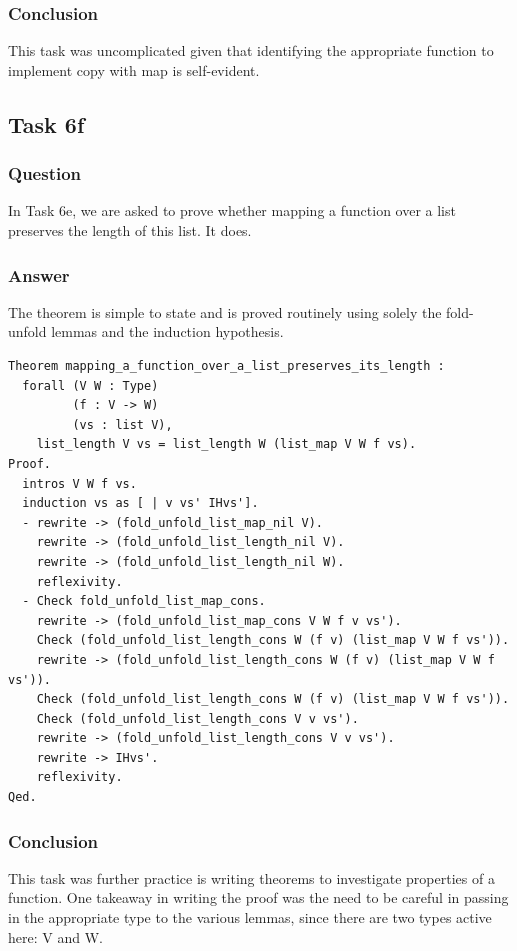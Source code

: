 \documentclass{article}
\begin{document}
\subsubsection{Conclusion}
This task was uncomplicated given that identifying the appropriate function to implement copy with map is self-evident.

\subsection{Task 6f}

\subsubsection{Question}
In Task 6e, we are asked to prove whether mapping a function over a list preserves the length of this list. It does.

\subsubsection{Answer}
The theorem is simple to state and is proved routinely using solely the fold-unfold lemmas and the induction hypothesis.

\begin{lstlisting}
Theorem mapping_a_function_over_a_list_preserves_its_length :
  forall (V W : Type)
         (f : V -> W)
         (vs : list V),
    list_length V vs = list_length W (list_map V W f vs).
Proof.
  intros V W f vs.
  induction vs as [ | v vs' IHvs'].
  - rewrite -> (fold_unfold_list_map_nil V).
    rewrite -> (fold_unfold_list_length_nil V).
    rewrite -> (fold_unfold_list_length_nil W).
    reflexivity.
  - Check fold_unfold_list_map_cons. 
    rewrite -> (fold_unfold_list_map_cons V W f v vs').
    Check (fold_unfold_list_length_cons W (f v) (list_map V W f vs')).
    rewrite -> (fold_unfold_list_length_cons W (f v) (list_map V W f vs')).
    Check (fold_unfold_list_length_cons W (f v) (list_map V W f vs')).
    Check (fold_unfold_list_length_cons V v vs'). 
    rewrite -> (fold_unfold_list_length_cons V v vs').
    rewrite -> IHvs'.
    reflexivity.
Qed.
\end{lstlisting}

\subsubsection{Conclusion}
This task was further practice is writing theorems to investigate properties of a function. One takeaway in writing the proof was the need to be careful in passing in the appropriate type to the various lemmas, since there are two types active here: V and W.
\end{document}
